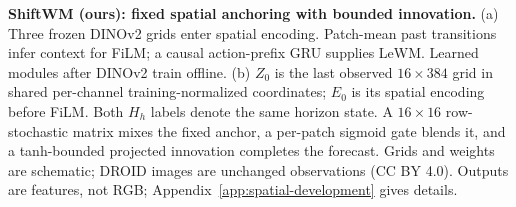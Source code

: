 \textbf{ShiftWM (ours): fixed spatial anchoring with bounded innovation.} (a) Three frozen DINOv2 grids enter spatial encoding. Patch-mean past transitions infer context for FiLM; a causal action-prefix GRU supplies LeWM. Learned modules after DINOv2 train offline. (b) $Z_0$ is the last observed $16\!\times\!384$ grid in shared per-channel training-normalized coordinates; $E_0$ is its spatial encoding before FiLM. Both $H_h$ labels denote the same horizon state. A $16\!\times\!16$ row-stochastic matrix mixes the fixed anchor, a per-patch sigmoid gate blends it, and a tanh-bounded projected innovation completes the forecast. Grids and weights are schematic; DROID images are unchanged observations (CC BY 4.0). Outputs are features, not RGB; Appendix~\ref{app:spatial-development} gives details.
